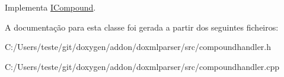 Implementa \hyperlink{class_i_compound_a27ef6c7f6cb888a9b017c06c062a13b5}{I\-Compound}.



A documentação para esta classe foi gerada a partir dos seguintes ficheiros\-:\begin{DoxyCompactItemize}
\item 
C\-:/\-Users/teste/git/doxygen/addon/doxmlparser/src/compoundhandler.\-h\item 
C\-:/\-Users/teste/git/doxygen/addon/doxmlparser/src/compoundhandler.\-cpp\end{DoxyCompactItemize}
